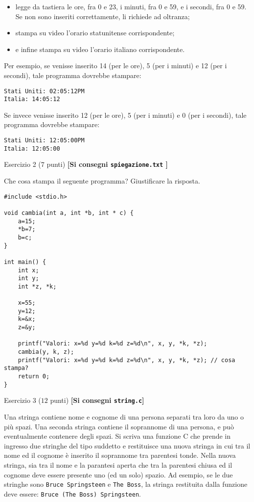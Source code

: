 \documentclass[12pt]{article}
\begin{document}
\begin{itemize}
\item legge da tastiera le ore, fra 0 e 23, i minuti, fra 0 e 59, e i secondi, fra 0 e 59. Se non sono
  inseriti correttamente, li richiede ad oltranza;
\item stampa su video l'orario statunitense corrispondente;
\item e infine stampa su video l'orario italiano corrispondente.
\end{itemize}

Per esempio, se venisse inserito 14 (per le ore), 5 (per i minuti) e 12 (per i secondi),
tale programma dovrebbe stampare:

\begin{verbatim}
Stati Uniti: 02:05:12PM
Italia: 14:05:12
\end{verbatim}

Se invece venisse inserito 12 (per le ore), 5 (per i minuti) e 0 (per i secondi),
tale programma dovrebbe stampare:

\begin{verbatim}
Stati Uniti: 12:05:00PM
Italia: 12:05:00
\end{verbatim}

\newpage
\begin{center}{\Large Esercizio 2} ($7$ punti) \textbf{[Si consegni \texttt{spiegazione.txt} ]}\end{center}
Che cosa stampa il seguente programma? Giustificare la risposta.
\begin{lstlisting}
#include <stdio.h>

void cambia(int a, int *b, int * c) {
	a=15;
	*b=7;
	b=c;
}

int main() {
	int x;
	int y;
	int *z, *k;

	x=55;
	y=12;
	k=&x;
	z=&y;

	printf("Valori: x=%d y=%d k=%d z=%d\n", x, y, *k, *z); 
	cambia(y, k, z);
	printf("Valori: x=%d y=%d k=%d z=%d\n", x, y, *k, *z); // cosa stampa?
	return 0;
}
\end{lstlisting}

\begin{center}{\Large Esercizio 3} ($12$ punti) \textbf{[Si consegni \texttt{string.c}]}\end{center}
Una stringa contiene nome e cognome di una persona separati tra loro da uno o pi\`u spazi.
Una seconda stringa contiene il soprannome di una persona, e pu\`o eventualmente contenere
degli spazi. Si scriva una funzione C che prende in ingresso due stringhe del tipo suddetto e restituisce
una nuova stringa in cui tra il nome ed il cognome \`e inserito il soprannome tra parentesi
tonde. Nella nuova stringa, sia tra il nome e la parantesi aperta che tra la parentesi chiusa
ed il cognome deve essere presente uno (ed un solo) spazio.
Ad esempio, se le due stringhe sono \texttt{Bruce Springsteen} e \texttt{The Boss}, la stringa
restituita dalla funzione deve essere: \texttt{Bruce (The Boss) Springsteen}.
\end{document}
